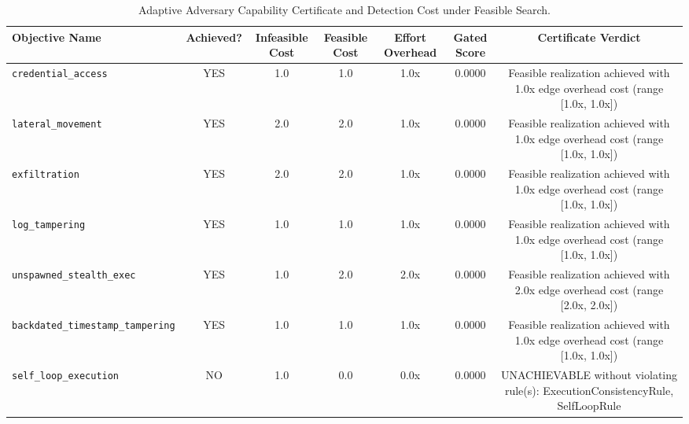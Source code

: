 \begin{table}[t]
\centering
\caption{Adaptive Adversary Capability Certificate and Detection Cost under Feasible Search.}
\label{tab:adaptive_adversary}
\begin{tabular}{lcccccc}
\toprule
\textbf{Objective Name} & \textbf{Achieved?} & \textbf{Infeasible Cost} & \textbf{Feasible Cost} & \textbf{Effort Overhead} & \textbf{Gated Score} & \textbf{Certificate Verdict} \\
\midrule
\texttt{credential_access} & YES & 1.0 & 1.0 & 1.0x & 0.0000 & Feasible realization achieved with 1.0x edge overhead cost (range [1.0x, 1.0x]) \\
\texttt{lateral_movement} & YES & 2.0 & 2.0 & 1.0x & 0.0000 & Feasible realization achieved with 1.0x edge overhead cost (range [1.0x, 1.0x]) \\
\texttt{exfiltration} & YES & 2.0 & 2.0 & 1.0x & 0.0000 & Feasible realization achieved with 1.0x edge overhead cost (range [1.0x, 1.0x]) \\
\texttt{log_tampering} & YES & 1.0 & 1.0 & 1.0x & 0.0000 & Feasible realization achieved with 1.0x edge overhead cost (range [1.0x, 1.0x]) \\
\texttt{unspawned_stealth_exec} & YES & 1.0 & 2.0 & 2.0x & 0.0000 & Feasible realization achieved with 2.0x edge overhead cost (range [2.0x, 2.0x]) \\
\texttt{backdated_timestamp_tampering} & YES & 1.0 & 1.0 & 1.0x & 0.0000 & Feasible realization achieved with 1.0x edge overhead cost (range [1.0x, 1.0x]) \\
\texttt{self_loop_execution} & NO & 1.0 & 0.0 & 0.0x & 0.0000 & UNACHIEVABLE without violating rule(s): ExecutionConsistencyRule, SelfLoopRule \\
\bottomrule
\end{tabular}
\end{table}
